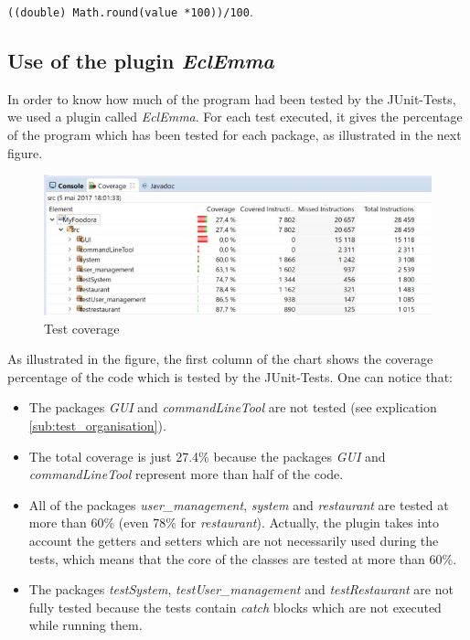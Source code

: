 \lstinline|((double) Math.round(value *100))/100|.

\subsection{Use of the plugin \textit{EclEmma}}
\label{sub:use_of_the_plugin_EclEmma}

In order to know how much of the program had been tested by the JUnit-Tests, we used a plugin called \textit{EclEmma}. For each test executed, it gives the percentage of the program which has been tested for each package, as illustrated in the next figure. 
\begin{figure}[H]
	\centering
	\includegraphics[width=1\linewidth]{./ima/testcoverage.jpg}
	\caption{Test coverage}
	\label{fig:test-coverage}
\end{figure}
As illustrated in the figure, the first column of the chart shows the coverage percentage of the code which is tested by the JUnit-Tests. One can notice that:
\begin{itemize}
	\item{} The packages \textit{GUI} and \textit{commandLineTool} are not tested (see explication \ref{sub:test_organisation}).
	\item{} The total coverage is just 27.4\% because the packages \textit{GUI} and \textit{commandLineTool}  represent more than half of the code.
	\item{} All of the packages \textit{user\_management}, \textit{system} and \textit{restaurant} are tested at more than 60\% (even 78\% for \textit{restaurant}). Actually, the plugin takes into account the getters and setters which are not necessarily used during the tests, which means that the core of the classes are tested at more than 60\%.
	\item{} The packages \textit{testSystem}, \textit{testUser\_management} and \textit{testRestaurant} are not fully tested because the tests contain \textit{catch} blocks which are not executed while running them.
\end{itemize}
